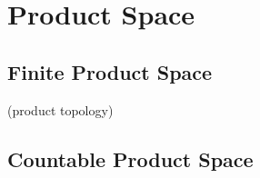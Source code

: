 \chapter{Product Space}

\section{Finite Product Space}

\begin{definition}
(product topology)
\end{definition}

\section{Countable Product Space}
















